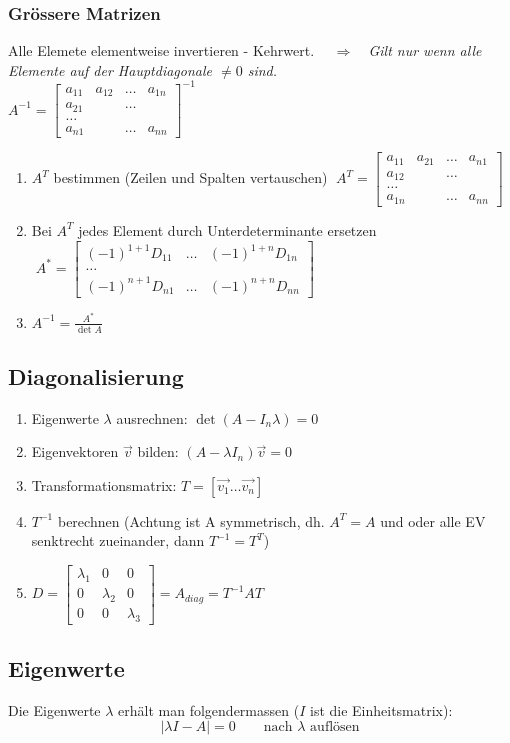 \subsubsection{Grössere Matrizen}
Alle Elemete elementweise invertieren - Kehrwert. $\quad \Rightarrow \quad $\textit{Gilt nur wenn alle Elemente auf der Hauptdiagonale $\neq 0$ sind.}\\

$A^{-1}= \begin{bmatrix}
a_{11} & a_{12}& \ldots & a_{1n}\\
a_{21}& &\ldots & \\
\ldots \\
a_{n1} & & \ldots & a_{nn}    			
\end{bmatrix}^{-1}$

\begin{enumerate}
	\item $A^T$ bestimmen (Zeilen und Spalten vertauschen)
	$ \; A^{T}= \begin{bmatrix}
	a_{11} & a_{21}& \ldots & a_{n1}\\
	a_{12}& &\ldots & \\
	\ldots \\
	a_{1n} & & \ldots & a_{nn}    			
	\end{bmatrix}$	
	\item Bei $A^T$ jedes Element durch Unterdeterminante ersetzen
	$\;A^*=	\begin{bmatrix}
	(-1)^{1+1}D_{11} &  \ldots	& (-1)^{1+n} D_{1n}\\
	\ldots\\
	(-1)^{n+1} D_{n1}& \ldots  & (-1)^{n+n} D_{nn}
	\end{bmatrix}$
	\item $A^{-1} = \frac{A^*}{\det A}$ 
\end{enumerate}


	\subsection{Diagonalisierung}
	\begin{enumerate}
		\item Eigenwerte $\lambda$ ausrechnen: $\det (A - I_n \lambda)=0$
		\item Eigenvektoren $\vec{v}$ bilden: $(A- \lambda I_n)\vec{v}=0$
		\item Transformationsmatrix: $T= [\vec{v_1} \ldots \vec{v_n}]$
		\item $T^{-1}$ berechnen (Achtung ist A symmetrisch, dh. $A^T=A$ und
		oder alle EV senktrecht zueinander, dann $T^{-1}=T^T$)
		\item $D=\begin{bmatrix}
		\lambda_1 &0 &0\\
		0& \lambda_2 &0\\
		0& 0& \lambda_3
		\end{bmatrix} = A_{diag} = T^{-1}AT$
	\end{enumerate}
	
	\subsection{Eigenwerte}
	Die Eigenwerte $\lambda$ erhält man folgendermassen ($I$ ist die Einheitsmatrix):
	\[ |\lambda I - A| = 0 \qquad \text{nach } \lambda \text{ auflösen} \]
\clearpage
\pagebreak